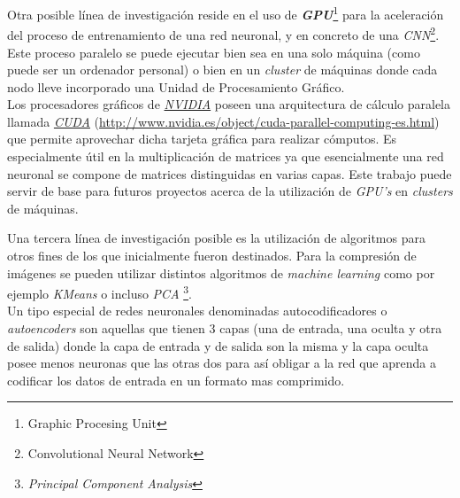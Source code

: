 Otra posible línea de investigación reside en el uso de \textbf{\textit{GPU}}\footnote{Graphic Procesing 
Unit} para la aceleración del proceso de entrenamiento de una red neuronal, y en concreto 
de una \textit{CNN}\footnote{Convolutional Neural Network}. 
Este proceso paralelo se puede ejecutar bien sea en una solo máquina (como puede ser un ordenador personal) 
o bien en un \textit{cluster} de máquinas donde cada nodo lleve incorporado una Unidad de Procesamiento Gráfico. \\
Los procesadores gráficos de \href{http://www.nvidia.es/page/home.html}{\textit{NVIDIA}} poseen una 
arquitectura de cálculo paralela llamada \href{http://www.nvidia.es/object/cuda-parallel-computing-es.html}{\textit{CUDA}}
(\url{http://www.nvidia.es/object/cuda-parallel-computing-es.html})
 que permite aprovechar dicha tarjeta gráfica para realizar cómputos. Es especialmente útil en la multiplicación 
de matrices ya que esencialmente una red neuronal se compone de matrices distinguidas en varias capas.
Este trabajo puede servir de base para futuros proyectos acerca de la utilización de \textit{GPU's} en 
\textit{clusters} de máquinas.
\newline

Una tercera línea de investigación posible es la utilización de algoritmos para otros fines de los que
inicialmente fueron destinados. Para la compresión de imágenes se pueden utilizar distintos algoritmos de
\textit{machine learning} como por ejemplo \textit{KMeans} o incluso \textit{PCA}
\footnote{\textit{Principal Component Analysis}}.\\
Un tipo especial de redes neuronales denominadas autocodificadores o \textit{autoencoders} son aquellas que
tienen 3 capas (una de entrada, una oculta y otra de salida) donde la capa de entrada y de salida son la misma
y la capa oculta posee menos neuronas que las otras dos para así obligar a la red que aprenda a codificar los
datos de entrada en un formato mas comprimido.


\clearpage

